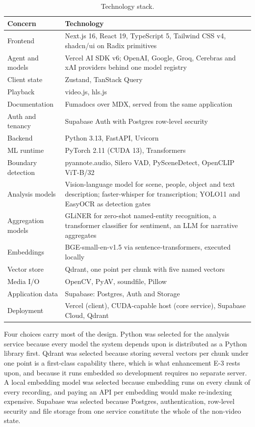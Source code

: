 \documentclass[11pt,a4paper]{article}
\begin{document}
\begin{table}[htbp]
\centering
\small
\begin{tabularx}{\textwidth}{@{}L{3.0cm}X@{}}
\toprule
\textbf{Concern} & \textbf{Technology} \\
\midrule
Frontend & Next.js 16, React 19, TypeScript 5, Tailwind CSS v4, shadcn/ui on Radix primitives \\
Agent and models & Vercel AI SDK v6; OpenAI, Google, Groq, Cerebras and xAI providers behind one model registry \\
Client state & Zustand, TanStack Query \\
Playback & video.js, hls.js \\
Documentation & Fumadocs over MDX, served from the same application \\
Auth and tenancy & Supabase Auth with Postgres row-level security \\
Backend & Python 3.13, FastAPI, Uvicorn \\
ML runtime & PyTorch 2.11 (CUDA 13), Transformers \\
Boundary detection & pyannote.audio, Silero VAD, PySceneDetect, OpenCLIP ViT-B/32 \\
Analysis models & Vision-language model for scene, people, object and text description; faster-whisper for transcription; YOLO11 and EasyOCR as detection gates \\
Aggregation models & GLiNER for zero-shot named-entity recognition, a transformer classifier for sentiment, an LLM for narrative aggregates \\
Embeddings & BGE-small-en-v1.5 via sentence-transformers, executed locally \\
Vector store & Qdrant, one point per chunk with five named vectors \\
Media I/O & OpenCV, PyAV, soundfile, Pillow \\
Application data & Supabase: Postgres, Auth and Storage \\
Deployment & Vercel (client), CUDA-capable host (core service), Supabase Cloud, Qdrant \\
\bottomrule
\end{tabularx}
\caption{Technology stack.}
\end{table}


Four choices carry most of the design. Python was selected for the analysis
service because every model the system depends upon is distributed as a Python
library first. Qdrant was selected because storing several vectors per chunk
under one point is a first-class capability there, which is what enhancement E-3
rests upon, and because it runs embedded so development requires no separate
server. A local embedding model was selected because embedding runs on every
chunk of every recording, and paying an API per embedding would make re-indexing
expensive. Supabase was selected because Postgres, authentication, row-level
security and file storage from one service constitute the whole of the non-video
state.
\end{document}
